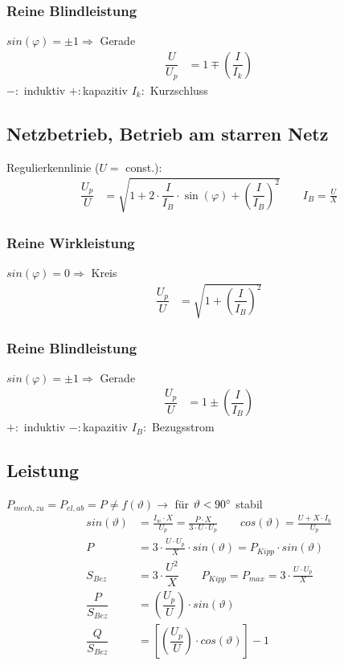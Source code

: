 \subsubsection{Reine Blindleistung}
$    sin(\varphi) = \pm1 \Rightarrow$ Gerade
\begin{align*}
    \dfrac{U}{U_p} &= 1 \mp \left(\dfrac{I}{I_k}\right)
\end{align*}
$- :$ induktiv \qquad $+ :$kapazitiv \qquad
$I_k :$ Kurzschluss

\subsection{Netzbetrieb, Betrieb am starren Netz}
Regulierkennlinie ($U=$ const.):
\begin{align*}
    \dfrac{U_p}{U} &=  \sqrt{1+2\cdot \dfrac{I}{I_B} \cdot \sin(\varphi) + \left( \dfrac{I}{I_B}\right)^2} \qquad I_B = \frac{U}{X}
\end{align*}
\subsubsection{Reine Wirkleistung}
$sin(\varphi) = 0 \Rightarrow$ Kreis
\begin{align*}
    \dfrac{U_p}{U} &= \sqrt{1+ \left(\dfrac{I}{I_B}\right)^2}
\end{align*}

\subsubsection{Reine Blindleistung}
$    sin(\varphi) = \pm1 \Rightarrow$ Gerade
\begin{align*}
    \dfrac{U_p}{U} &= 1 \pm \left(\dfrac{I}{I_B}\right)
\end{align*}
$+ :$ induktiv \qquad $- :$kapazitiv \qquad $I_B :$ Bezugsstrom

\subsection{Leistung}
$P_{mech,zu} = P_{el,ab} = P \neq f(\vartheta) \rightarrow$ für $\vartheta < 90\degree$ stabil\\
\begin{align*}
    sin(\vartheta) &= \frac{I_w\cdot X}{U_p} = \frac{P\cdot X}{3\cdot U \cdot U_p}  \qquad cos(\vartheta) = \frac{U+X \cdot I_b}{U_p}\\
    P &= 3 \cdot \frac{U\cdot U_p}{X} \cdot sin(\vartheta) = P_{Kipp} \cdot sin(\vartheta)\\
    S_{Bez} &= 3 \cdot \dfrac{U^2}{X} \qquad P_{Kipp} = P_{max} = 3\cdot \frac{U \cdot U_p}{X}\\
    \dfrac{P}{S_{Bez}} &= \left(\dfrac{U_p}{U}\right) \cdot sin(\vartheta)\\
    \dfrac{Q}{S_{Bez}} &= \left[\left(\dfrac{U_p}{U}\right) \cdot cos(\vartheta)\right] -1\\
\end{align*}


